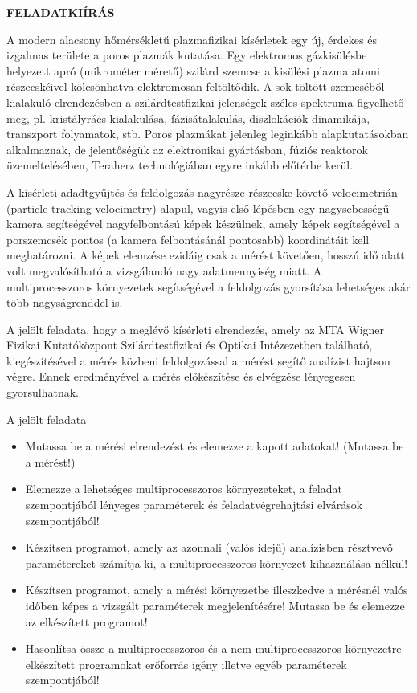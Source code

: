 \clearpage
\begin{center}
\large
\textbf{FELADATKIÍRÁS}\\
\end{center}

A modern alacsony hőmérsékletű plazmafizikai kísérletek egy új, érdekes és izgalmas területe a poros plazmák
kutatása. Egy elektromos gázkisülésbe helyezett apró (mikrométer méretű) szilárd szemcse a kisülési plazma
atomi részecskéivel kölcsönhatva elektromosan feltöltődik. A sok töltött szemcséből kialakuló elrendezésben a
szilárdtestfizikai jelenségek széles spektruma figyelhető meg, pl. kristályrács kialakulása, fázisátalakulás,
diszlokációk dinamikája, transzport folyamatok, stb. Poros plazmákat jelenleg leginkább alapkutatásokban
alkalmaznak, de jelentőségük az elektronikai gyártásban, fúziós reaktorok üzemeltelésében, Teraherz
technológiában egyre inkább előtérbe kerül.

A kísérleti adadtgyűjtés és feldolgozás nagyrésze részecske-követő velocimetrián (particle tracking velocimetry)
alapul, vagyis első lépésben egy nagysebességű kamera segítségével nagyfelbontású képek készülnek, amely
képek segítségével a porszemcsék pontos (a kamera felbontásánál pontosabb) koordinátáit kell meghatározni. A
képek elemzése ezidáig csak a mérést követően, hosszú idő alatt volt megvalósítható a vizsgálandó nagy
adatmennyiség miatt. A multiprocesszoros környezetek segítségével a feldolgozás gyorsítása lehetséges akár
több nagyságrenddel is.

A jelölt feladata, hogy a meglévő kísérleti elrendezés, amely az MTA Wigner Fizikai Kutatóközpont
Szilárdtestfizikai és Optikai Intézezetben található, kiegészítésével a mérés közbeni feldolgozással a mérést
segítő analízist hajtson végre. Ennek eredményével a mérés előkészítése és elvégzése lényegesen gyorsulhatnak.

A jelölt feladata

\begin{itemize}
	\item Mutassa be a mérési elrendezést és elemezze a kapott adatokat! (Mutassa
	be a mérést!)
	\item Elemezze a lehetséges multiprocesszoros környezeteket, a feladat
	szempontjából lényeges paraméterek és feladatvégrehajtási elvárások szempontjából!
	\item Készítsen programot, amely az azonnali (valós idejű) analízisben résztvevő paramétereket számítja ki, a
	multiprocesszoros környezet kihasználása nélkül!
	\item Készítsen programot, amely a mérési környezetbe illeszkedve a mérésnél
	valós időben képes a vizsgált paraméterek megjelenítésére! Mutassa be és
	elemezze az elkészített programot!
	\item Hasonlítsa össze a multiprocesszoros és a nem-multiprocesszoros
	környezetre elkészített programokat erőforrás igény illetve egyéb paraméterek szempontjából!

\end{itemize}

